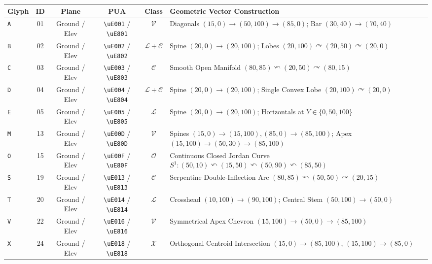 \documentclass[10pt,oneside,letterpaper]{article}
\begin{document}
\begin{table}[htbp]
\centering
\small
{}
\begin{tabularx}{\textwidth}{lccccX}
\toprule
\color{gold}\textbf{Glyph} & \color{gold}\textbf{ID} & \color{gold}\textbf{Plane} & \color{gold}\textbf{PUA} & \color{gold}\textbf{Class} & \color{gold}\textbf{Geometric Vector Construction} \\
\midrule
\texttt{A} & 01 & Ground / Elev & \texttt{\textbackslash uE001} / \texttt{\textbackslash uE801} & $\mathcal{V}$ & Diagonals $(15,0) \to (50,100) \to (85,0)$; Bar $(30,40) \to (70,40)$ \\
\texttt{B} & 02 & Ground / Elev & \texttt{\textbackslash uE002} / \texttt{\textbackslash uE802} & $\mathcal{L}+\mathcal{C}$ & Spine $(20,0) \to (20,100)$; Lobes $(20,100) \curvearrowright (20,50) \curvearrowright (20,0)$ \\
\texttt{C} & 03 & Ground / Elev & \texttt{\textbackslash uE003} / \texttt{\textbackslash uE803} & $\mathcal{C}$ & Smooth Open Manifold $(80,85) \curvearrowleft (20,50) \curvearrowright (80,15)$ \\
\texttt{D} & 04 & Ground / Elev & \texttt{\textbackslash uE004} / \texttt{\textbackslash uE804} & $\mathcal{L}+\mathcal{C}$ & Spine $(20,0) \to (20,100)$; Single Convex Lobe $(20,100) \curvearrowright (20,0)$ \\
\texttt{E} & 05 & Ground / Elev & \texttt{\textbackslash uE005} / \texttt{\textbackslash uE805} & $\mathcal{L}$ & Spine $(20,0) \to (20,100)$; Horizontals at $Y \in \{0, 50, 100\}$ \\
\texttt{M} & 13 & Ground / Elev & \texttt{\textbackslash uE00D} / \texttt{\textbackslash uE80D} & $\mathcal{V}$ & Spines $(15,0) \to (15,100), (85,0) \to (85,100)$; Apex $(15,100) \to (50,30) \to (85,100)$ \\
\texttt{O} & 15 & Ground / Elev & \texttt{\textbackslash uE00F} / \texttt{\textbackslash uE80F} & $\mathcal{O}$ & Continuous Closed Jordan Curve $S^1: (50,10) \curvearrowleft (15,50) \curvearrowleft (50,90) \curvearrowleft (85,50)$ \\
\texttt{S} & 19 & Ground / Elev & \texttt{\textbackslash uE013} / \texttt{\textbackslash uE813} & $\mathcal{C}$ & Serpentine Double-Inflection Arc $(80,85) \curvearrowleft (50,50) \curvearrowright (20,15)$ \\
\texttt{T} & 20 & Ground / Elev & \texttt{\textbackslash uE014} / \texttt{\textbackslash uE814} & $\mathcal{L}$ & Crosshead $(10,100) \to (90,100)$; Central Stem $(50,100) \to (50,0)$ \\
\texttt{V} & 22 & Ground / Elev & \texttt{\textbackslash uE016} / \texttt{\textbackslash uE816} & $\mathcal{V}$ & Symmetrical Apex Chevron $(15,100) \to (50,0) \to (85,100)$ \\
\texttt{X} & 24 & Ground / Elev & \texttt{\textbackslash uE018} / \texttt{\textbackslash uE818} & $\mathcal{X}$ & Orthogonal Centroid Intersection $(15,0) \to (85,100)$, $(15,100) \to (85,0)$ \\
\bottomrule
\end{tabularx}
\end{table}
\end{document}
